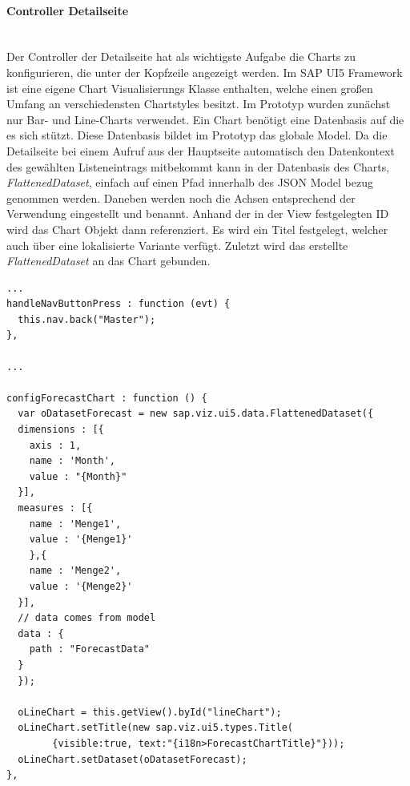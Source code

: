 \paragraph{Controller Detailseite}$\;$ \\
Der Controller der Detailseite hat als wichtigste Aufgabe die Charts zu konfigurieren, die unter der Kopfzeile angezeigt werden. Im SAP UI5 Framework ist eine eigene Chart Visualisierungs Klasse enthalten, welche einen großen Umfang an verschiedensten Chartstyles besitzt. Im Prototyp wurden zunächst nur Bar- und Line-Charts verwendet. Ein Chart benötigt eine Datenbasis auf die es sich stützt. Diese Datenbasis bildet im Prototyp das globale Model. Da die Detailseite bei einem Aufruf aus der Hauptseite automatisch den Datenkontext des gewählten Listeneintrags mitbekommt kann in der Datenbasis des Charts, \textit{FlattenedDataset}, einfach auf einen Pfad innerhalb des JSON Model bezug genommen werden. Daneben werden noch die Achsen entsprechend der Verwendung eingestellt und benannt. Anhand der in der View festgelegten ID wird das Chart Objekt dann referenziert. Es wird ein Titel festgelegt, welcher auch über eine lokalisierte Variante verfügt. Zuletzt wird das erstellte \textit{FlattenedDataset} an das Chart gebunden.

\vspace{1em}
\begin{lstlisting}[frame=htrbl, caption=Chart Konfigurierung, label=lst:chartconfig]
...
handleNavButtonPress : function (evt) {
  this.nav.back("Master");
},

...
	
configForecastChart : function () {
  var oDatasetForecast = new sap.viz.ui5.data.FlattenedDataset({
  dimensions : [{
    axis : 1,
    name : 'Month',
    value : "{Month}"
  }],
  measures : [{
    name : 'Menge1',
    value : '{Menge1}'
    },{
    name : 'Menge2',
    value : '{Menge2}'
  }],		
  // data comes from model
  data : {
    path : "ForecastData"
  }
  });

  oLineChart = this.getView().byId("lineChart");
  oLineChart.setTitle(new sap.viz.ui5.types.Title(
        {visible:true, text:"{i18n>ForecastChartTitle}"}));
  oLineChart.setDataset(oDatasetForecast);
},
\end{lstlisting}


